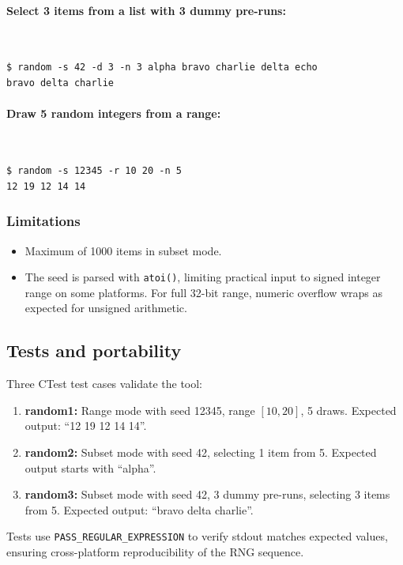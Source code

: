 \paragraph{Select 3 items from a list with 3 dummy pre-runs:}
{\tt
\begin{verbatim}
$ random -s 42 -d 3 -n 3 alpha bravo charlie delta echo
bravo delta charlie
\end{verbatim}
}

\paragraph{Draw 5 random integers from a range:}
{\tt
\begin{verbatim}
$ random -s 12345 -r 10 20 -n 5
12 19 12 14 14
\end{verbatim}
}

\subsubsection{Limitations}

\begin{itemize}
\item Maximum of 1000 items in subset mode.
\item The seed is parsed with {\tt atoi()}, limiting practical input to
  signed integer range on some platforms. For full 32-bit range,
  numeric overflow wraps as expected for unsigned arithmetic.
\end{itemize}

\subsection{Tests and portability}

Three CTest test cases validate the tool:

\begin{enumerate}
\item {\bf random1:} Range mode with seed 12345, range $[10, 20]$, 5
  draws. Expected output: ``12 19 12 14 14''.
\item {\bf random2:} Subset mode with seed 42, selecting 1 item from 5.
  Expected output starts with ``alpha''.
\item {\bf random3:} Subset mode with seed 42, 3 dummy pre-runs,
  selecting 3 items from 5. Expected output: ``bravo delta charlie''.
\end{enumerate}

Tests use {\tt PASS\_REGULAR\_EXPRESSION} to verify stdout matches
expected values, ensuring cross-platform reproducibility of the RNG
sequence.

